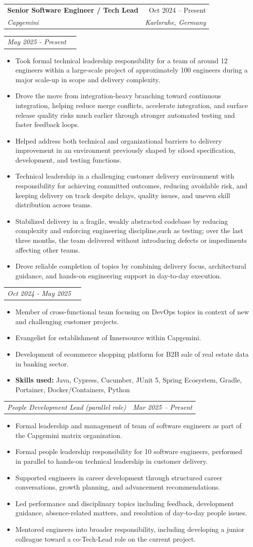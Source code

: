 \documentclass[a4paper,12pt]{article}
\makeatletter
\newcommand{\resumeItem}[1]{
	\item\small{
		{#1 \vspace{-2pt}}
	}
}
\newcommand{\resumeSubheading}[4]{
	\vspace{-2pt}\item
	\begin{tabular*}{0.97\textwidth}[t]{l@{\extracolsep{\fill}}r}
		\textbf{#1} & #2 \\
		\textit{\small#3} & \textit{\small #4} \\
	\end{tabular*}\vspace{-7pt}
}
\newcommand{\resumeSubSubheading}[2]{
	\item
	\begin{tabular*}{0.97\textwidth}{l@{\extracolsep{\fill}}r}
		\textit{\small#1} & \textit{\small #2} \\
	\end{tabular*}\vspace{-7pt}
}
\newcommand{\resumeItemListStart}{\begin{itemize}}
\newcommand{\resumeItemListEnd}{\end{itemize}\vspace{-5pt}}
\makeatother
\begin{document}
\resumeSubheading
{Senior Software Engineer / Tech Lead}{Oct 2024 -- Present}
{Capgemini}{Karlsruhe, Germany}
	\resumeSubSubheading{May 2025 - Present}{}
	\resumeItemListStart
		\resumeItem{Took formal technical leadership responsibility for a team of around 12 engineers within a large-scale project of 
					approximately 100 engineers during a major scale-up in scope and delivery complexity.}
		\resumeItem{Drove the move from integration-heavy branching toward continuous integration, helping reduce merge conflicts, accelerate integration, 
					and surface release quality risks much earlier through stronger automated testing and faster feedback loops.}
		\resumeItem{Helped address both technical and organizational barriers to delivery improvement in an environment previously shaped by siloed 
					specification, development, and testing functions.}
		\resumeItem{Technical leadership in a challenging customer delivery environment with responsibility for achieving committed outcomes, reducing avoidable 
					risk, and keeping delivery on track despite delays, quality issues, and uneven skill distribution across teams.}
		\resumeItem{Stabilized delivery in a fragile, weakly abstracted codebase by reducing complexity and enforcing engineering discipline,such as testing; over the last 
					three months, the team delivered without introducing defects or impediments affecting other teams.}
		\resumeItem{Drove reliable completion of topics by combining delivery focus, architectural guidance, and hands-on engineering support in day-to-day execution.}
		\resumeItemListEnd
		\resumeSubSubheading{Oct 2024 - May 2025}{}
		\resumeItemListStart
		\resumeItem{Member of cross-functional team focusing on DevOps topics in context of new and challenging customer projects.}
		\resumeItem{Evangelist for establishment of Innersource within Capgemini.}
		\resumeItem{Development of ecommerce shopping platform for B2B sale of real estate data in banking sector.}
		\resumeItem{\textbf{Skills used: }{Java, Cypress, Cucumber, JUnit 5, Spring Ecosystem, Gradle, Portainer, Docker/Containers, Python}}
	\resumeItemListEnd

	\resumeSubSubheading
	{People Development Lead (parallel role)}{Mar 2025 -- Present}
		\resumeItemListStart
			\resumeItem{Formal leadership and management of team of software engineers as part of the Capgemini matrix organization.}
			\resumeItem{Formal people leadership responsibility for 10 software engineers, performed in parallel to hands-on technical leadership in customer delivery.}
			\resumeItem{Supported engineers in career development through structured career conversations, growth planning, and advancement recommendations.}
			\resumeItem{Led performance and disciplinary topics including feedback, development guidance, absence-related matters, and resolution of day-to-day people issues.}
			\resumeItem{Mentored engineers into broader responsibility, including developing a junior colleague toward a co-Tech-Lead role on the current project.}
		\resumeItemListEnd
\end{document}
